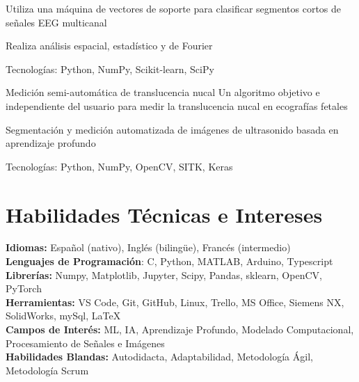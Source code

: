 \documentclass{resume}
\begin{document}
    \resumeItemListStart
    \item {Utiliza una máquina de vectores de soporte para clasificar segmentos cortos de señales EEG multicanal}
    \item {Realiza análisis espacial, estadístico y de Fourier}
    \item {Tecnologías: Python, NumPy, Scikit-learn, SciPy}
    \resumeItemListEnd

    \resumeProject
    {Medición semi-automática de translucencia nucal} %
    {Un algoritmo objetivo e independiente del usuario para medir la translucencia nucal en ecografías fetales}
    {} %

    \resumeItemListStart
    \item
    {Segmentación y medición automatizada de imágenes de ultrasonido basada en aprendizaje profundo}
    \item {Tecnologías: Python, NumPy, OpenCV, SITK, Keras}
    \resumeItemListEnd

    \resumeSubHeadingListEnd


    \vspace{-5mm}


    \section{\textbf{Habilidades Técnicas e Intereses}} \label{sec:skills}
    \begin{itemize}[leftmargin=0.05in, label={}]
        \small{\item{
            \textbf{Idiomas:}{ Español (nativo), Inglés (bilingüe}), Francés (intermedio) } \\
        \textbf{Lenguajes de Programación}{: C, Python, MATLAB, Arduino, Typescript } \\
        \textbf{Librerías:}{ Numpy, Matplotlib, Jupyter, Scipy, Pandas, sklearn, OpenCV, PyTorch}\\
        \textbf{Herramientas:}{ VS Code, Git, GitHub, Linux, Trello, MS Office, Siemens NX, SolidWorks, mySql,
            \LaTeX} \\
        \textbf{Campos de Interés:}
        {ML, IA, Aprendizaje Profundo, Modelado Computacional, Procesamiento de Señales e Imágenes} \\
        \textbf{Habilidades Blandas:}{ Autodidacta, Adaptabilidad, Metodología Ágil, Metodología Scrum} \\
        }
    \end{itemize}
\end{document}
